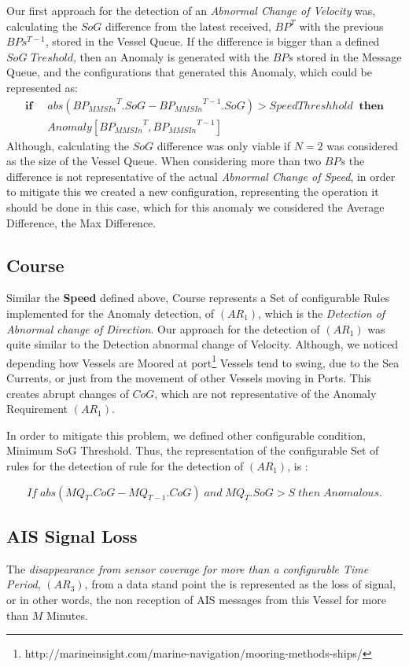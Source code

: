 Our first approach for the detection of an \textit{Abnormal Change of Velocity} was, calculating the $SoG$ difference from the latest received, $BP^T$ with the previous $BPs^{T-1}$, stored in the Vessel Queue.
If the difference is bigger than a defined $SoG$ $Treshold$, then an Anomaly is generated with the $BPs$ stored in the Message Queue, and the configurations that generated this Anomaly, which could be represented as:
\begin{align*}
\mathbf{if}\;\;& abs({BP_{MMSIn}}^{T}.SoG - {BP_{MMSIn}}^{T-1}.SoG) > SpeedThreshhold
\;\;\mathbf{then} \\ 
&Anomaly[{BP_{MMSIn}}^{T}, {BP_{MMSIn}}^{T-1}] 
\end{align*}
Although, calculating the $SoG$ difference was only viable if  $N = 2 $ was considered as the size of the Vessel Queue.
When considering more than two $BPs$ the difference is not representative of the actual \textit{Abnormal Change of Speed}, in order to mitigate this we created a new configuration, representing the operation it should be done in this case, which for this anomaly we considered the Average Difference, the Max Difference.

\subsection{Course}
\label{subsection: 4 Course}
Similar the \textbf{Speed} defined above, Course represents a Set of configurable Rules implemented for the Anomaly detection, of $(AR_1)$, which is the \textit{Detection of Abnormal change of Direction}. 
Our approach for the detection of $(AR_1)$ was quite similar to the {Detection abnormal change of Velocity}. 
Although, we noticed depending how Vessels are Moored at port\footnote{http://marineinsight.com/marine-navigation/mooring-methods-ships/}  Vessels tend to swing, due to the Sea Currents, or just from the movement of other Vessels moving in Ports. This creates abrupt changes of $CoG$, which are not representative of the Anomaly Requirement $(AR_1)$.

In order to mitigate this problem, we defined other configurable condition, Minimum SoG Threshold. Thus, the representation of the configurable Set of rules for the detection of rule for the detection of $(AR_1)$, is :

\[ If\; abs(MQ_{T}.CoG - MQ_{T-1}.CoG)\;and\; MQ_T.SoG > S\; then\; Anomalous.\]

\subsection{AIS Signal Loss}
\label{subsection: 4 AIS Signal Loss}
The \textit{disappearance from sensor coverage for more than a configurable Time Period}, $(AR_3)$, from a data stand point the is represented as the loss of signal, or in other words, the non reception of AIS messages from this Vessel for more than $M$ Minutes.

